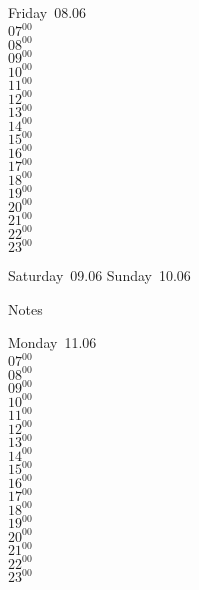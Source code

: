 \documentclass[11pt, a4paper]{book}\usepackage[]{graphicx}\usepackage[]{color}
\begin{document}
\begin{weekdaybox}
  Friday~08.06\\
  { 
  \vfill
  $07^{00}$\\
$08^{00}$\\
$09^{00}$\\
$10^{00}$\\
$11^{00}$\\
$12^{00}$\\
$13^{00}$\\
$14^{00}$\\
$15^{00}$\\
$16^{00}$\\
$17^{00}$\\
$18^{00}$\\
$19^{00}$\\
$20^{00}$\\
$21^{00}$\\
$22^{00}$\\
$23^{00}$\\
  }
\end{weekdaybox}
\begin{weekendbox}
  Saturday~09.06
  \tcblower
  Sunday~10.06
\end{weekendbox} %
\begin{notebox}
  Notes
\end{notebox}
\clearpage
\begin{headerbox}
\end{headerbox}
\begin{weekdaybox}
  Monday~11.06\\
  { 
  \vfill
  $07^{00}$\\
$08^{00}$\\
$09^{00}$\\
$10^{00}$\\
$11^{00}$\\
$12^{00}$\\
$13^{00}$\\
$14^{00}$\\
$15^{00}$\\
$16^{00}$\\
$17^{00}$\\
$18^{00}$\\
$19^{00}$\\
$20^{00}$\\
$21^{00}$\\
$22^{00}$\\
$23^{00}$\\
  }
\end{weekdaybox}
\end{document}
